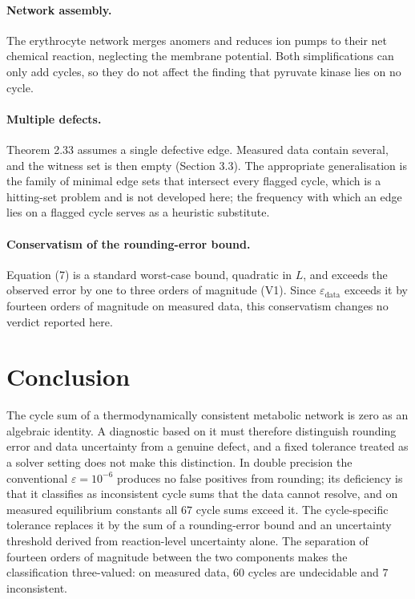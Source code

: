 \documentclass[11pt,a4paper]{article}
\theoremstyle{pstyle}
\theoremstyle{definition}
\theoremstyle{remark}
\newcommand{\eps}{\varepsilon}
\newcommand{\epsdata}{\eps_{\mathrm{data}}}
\begin{document}
\paragraph{Network assembly.} The erythrocyte network merges anomers and
reduces ion pumps to their net chemical reaction, neglecting the
membrane potential. Both simplifications can only add cycles, so they
do not affect the finding that pyruvate kinase lies on no cycle.

\paragraph{Multiple defects.} Theorem 2.33 assumes a
single defective edge. Measured data contain several, and the witness
set is then empty (Section 3.3). The appropriate generalisation
is the family of minimal edge sets that intersect every flagged cycle,
which is a hitting-set problem and is not developed here; the frequency
with which an edge lies on a flagged cycle serves as a heuristic
substitute.

\paragraph{Conservatism of the rounding-error bound.}
Equation (7) is a standard worst-case bound, quadratic in $L$,
and exceeds the observed error by one to three orders of magnitude
(V1). Since $\epsdata$ exceeds it by fourteen orders of magnitude on
measured data, this conservatism changes no verdict reported here.

\section{Conclusion}
\label{sec:conclusion}

The cycle sum of a thermodynamically consistent metabolic network is
zero as an algebraic identity. A diagnostic based on it must therefore
distinguish rounding error and data uncertainty from a genuine defect,
and a fixed tolerance treated as a solver setting does not make this
distinction. In double precision the conventional $\eps=10^{-6}$
produces no false positives from rounding; its deficiency is that it
classifies as inconsistent cycle sums that the data cannot resolve, and
on measured equilibrium constants all $67$ cycle sums exceed it. The
cycle-specific tolerance replaces it by the sum of a rounding-error
bound and an uncertainty threshold derived from reaction-level
uncertainty alone. The separation of fourteen orders of magnitude
between the two components makes the classification three-valued: on
measured data, $60$ cycles are undecidable and $7$ inconsistent.
\end{document}
